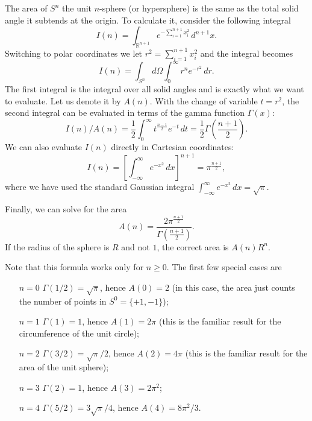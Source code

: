 \documentclass[12pt]{article}
\def\R{\mathbb{R}}
\begin{document}
The area of $S^n$ the unit $n$-sphere (or hypersphere) is the same as the total
solid angle it subtends at the origin. To calculate it, consider the following
integral
\[
  I(n) = \int_{\R^{n+1}} e^{-\sum_{i=1}^{n+1} x_i^2}\, d^{n+1} x.
\]
Switching to polar coordinates we let $r^2=\sum_{i=1}^{n+1} x_i^2$ and the
integral becomes
\[
  I(n) = \int_{S^n} d\Omega \int_{0}^{\infty} r^{n} e^{-r^2}\, dr.
\]
The first integral is the integral over all solid angles and is exactly what we
want to evaluate. Let us denote it by $A(n)$. With the change of variable
$t=r^2$, the second integral can be evaluated in terms of the gamma function
$\Gamma(x)$:
\[
  I(n)/A(n) = \frac{1}{2}\int_0^\infty t^{\frac{n-1}{2}} e^{-t}\, dt
    = \frac{1}{2}\Gamma\left(\frac{n+1}{2}\right).
\]
We can also evaluate $I(n)$ directly in Cartesian coordinates:
\[
  I(n) = \left[ \int_{-\infty}^\infty e^{-x^2}\, dx \right]^{n+1}
    = \pi^{\frac{n+1}{2}},
\]
where we have used the standard Gaussian integral $\int_{-\infty}^\infty
e^{-x^2}\, dx = \sqrt{\pi}$.

Finally, we can solve for the area
\[ A(n) = \frac{2\pi^{\frac{n+1}{2}}}{\Gamma\left(\frac{n+1}{2}\right)}. \]
If the radius of the sphere is $R$ and not $1$, the correct area is
$A(n)R^{n}$.

Note that this formula works only for $n\ge0$. The first few special cases
are
\begin{itemize}
  \item[$n=0$] $\Gamma(1/2)=\sqrt{\pi}$, hence $A(0)=2$ (in this case, the
    area just counts the number of points in $S^0=\{+1,-1\}$);
  \item[$n=1$] $\Gamma(1)=1$, hence $A(1)=2\pi$ (this is the familiar result
    for the circumference of the unit circle);
  \item[$n=2$] $\Gamma(3/2)=\sqrt{\pi}/2$, hence $A(2)=4\pi$ (this is the
    familiar result for the area of the unit sphere);
  \item[$n=3$] $\Gamma(2)=1$, hence $A(3)=2\pi^2$;
  \item[$n=4$] $\Gamma(5/2)=3\sqrt{\pi}/4$, hence $A(4)=8\pi^2/3$.
\end{itemize}
\end{document}
